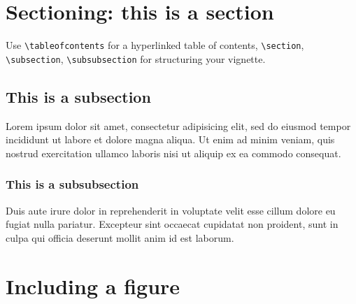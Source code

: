 \documentclass{article}
\begin{document}
\section{Sectioning: this is a section}

Use \verb+\tableofcontents+ for a hyperlinked table of contents,
\verb+\section+, \verb+\subsection+, \verb+\subsubsection+ for structuring your vignette.

\subsection{This is a subsection}
Lorem ipsum dolor sit amet, consectetur adipisicing elit, sed do eiusmod tempor incididunt ut labore et dolore magna aliqua. Ut enim ad minim veniam, quis nostrud exercitation ullamco laboris nisi ut aliquip ex ea commodo consequat.

\subsubsection{This is a subsubsection}
Duis aute irure dolor in reprehenderit in voluptate velit esse cillum dolore eu fugiat nulla pariatur. Excepteur sint occaecat cupidatat non proident, sunt in culpa qui officia deserunt mollit anim id est laborum.
 
\section{Including a figure}
\end{document}
